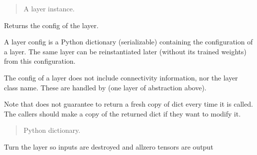 \documentclass[letterpaper,10pt,english]{sphinxmanual}
\begin{document}
\begin{fulllineitems}
\begin{fulllineitems}
\begin{quote}
\begin{description}
\sphinxAtStartPar
A layer instance.

\end{description}\end{quote}

\end{fulllineitems}


\begin{fulllineitems}
\label{\detokenize{beyondml.tflow.layers:beyondml.tflow.layers.FilterLayer.FilterLayer.get_config}}
\pysigstartsignatures
{}
\pysigstopsignatures
\sphinxAtStartPar
Returns the config of the layer.

\sphinxAtStartPar
A layer config is a Python dictionary (serializable)
containing the configuration of a layer.
The same layer can be reinstantiated later
(without its trained weights) from this configuration.

\sphinxAtStartPar
The config of a layer does not include connectivity
information, nor the layer class name. These are handled
by  (one layer of abstraction above).

\sphinxAtStartPar
Note that  does not guarantee to return a fresh copy of
dict every time it is called. The callers should make a copy of the
returned dict if they want to modify it.
\begin{quote}\begin{description}
\sphinxAtStartPar
Python dictionary.

\end{description}\end{quote}

\end{fulllineitems}


\begin{fulllineitems}
\label{\detokenize{beyondml.tflow.layers:beyondml.tflow.layers.FilterLayer.FilterLayer.turn_off}}
\pysigstartsignatures
{}
\pysigstopsignatures
\sphinxAtStartPar
Turn the layer  so inputs are destroyed and all\sphinxhyphen{}zero tensors are output


\end{fulllineitems}
\end{fulllineitems}
\end{document}
